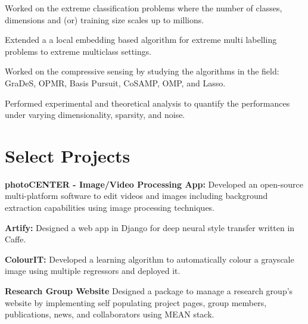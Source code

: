 \documentclass[US paper]{deedy-resume} %
\begin{document}
{
\begin{tightitemize}
\item Worked on the extreme classification problems where the number of classes, dimensions and (or) training size scales up to millions.
\item Extended a a local embedding based algorithm for extreme multi labelling problems to extreme multiclass settings.
\end{tightitemize}
\vspace{1mm}

\begin{tightitemize}
\item Worked on the compressive sensing by studying the algorithms in the field: GraDeS, OPMR, Basis Pursuit, CoSAMP, OMP, and Lasso.
\item Performed experimental and theoretical analysis to quantify the performances under varying dimensionality, sparsity, and noise. 
\end{tightitemize}
\vspace{1mm}

\vspace{-5pt}

\section{Select Projects}

\vspace{5pt}
\begin{tightitemize}
\item \textbf{photoCENTER - Image/Video Processing App:} Developed an open-source multi-platform software to edit videos and images including background extraction capabilities using image processing techniques. \vspace{0.5mm}
\item \textbf{Artify:} Designed a web app in Django for deep neural style transfer written in Caffe.
\vspace{0.5mm}
\item \textbf{ColourIT:} Developed a learning algorithm to automatically colour a grayscale image using multiple regressors and deployed it. \vspace{0.5mm}
\item \textbf{Research Group Website} Designed a package to manage a research group's website by implementing self populating project pages, group members, publications, news, and collaborators using MEAN stack.
\end{tightitemize}


}
\end{document}
